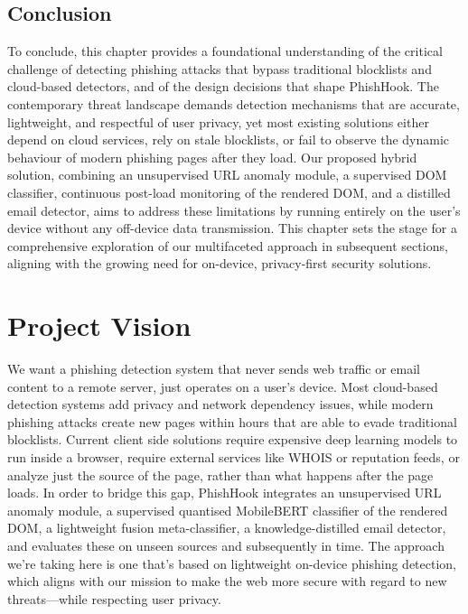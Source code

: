 \documentclass{FastFyp}
\begin{document}
\section{Conclusion}
To conclude, this chapter provides a foundational understanding of the critical challenge of detecting phishing attacks that bypass traditional blocklists and cloud-based detectors, and of the design decisions that shape PhishHook. The contemporary threat landscape demands detection mechanisms that are accurate, lightweight, and respectful of user privacy, yet most existing solutions either depend on cloud services, rely on stale blocklists, or fail to observe the dynamic behaviour of modern phishing pages after they load. Our proposed hybrid solution, combining an unsupervised URL anomaly module, a supervised DOM classifier, continuous post-load monitoring of the rendered DOM, and a distilled email detector, aims to address these limitations by running entirely on the user's device without any off-device data transmission.  This chapter sets the stage for a comprehensive exploration of our multifaceted approach in subsequent sections, aligning with the growing need for on-device, privacy-first security solutions.

\chapter{Project Vision}
\label{ch:vision}

We want a phishing detection system that never sends web traffic or email content to a remote server, just operates on a user's device. Most cloud-based detection systems add privacy and network dependency issues, while modern phishing attacks create new pages within hours that are able to evade traditional blocklists. Current client side solutions require expensive deep learning models to run inside a browser, require external services like WHOIS or reputation feeds, or analyze just the source of the page, rather than what happens after the page loads. In order to bridge this gap, PhishHook integrates an unsupervised URL anomaly module, a supervised quantised MobileBERT classifier of the rendered DOM, a lightweight fusion meta-classifier, a knowledge-distilled email detector, and evaluates these on unseen sources and subsequently in time. The approach we're taking here is one that's based on lightweight on-device phishing detection, which aligns with our mission to make the web more secure with regard to new threats—while respecting user privacy.
\end{document}
